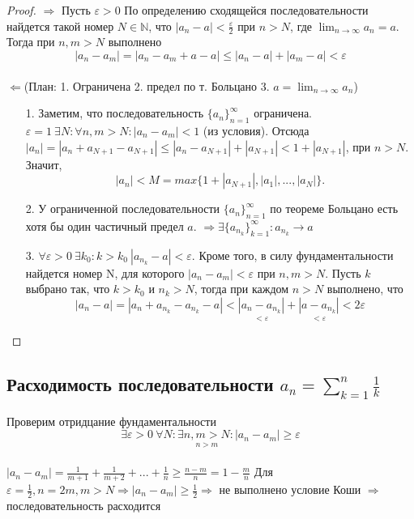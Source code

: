 \documentclass[12pt]{article}
\theoremstyle{definition}
\begin{document}
\begin{proof}
$\Longrightarrow$ Пусть $\varepsilon > 0$ По определению сходящейся последовательности найдется такой номер $N \in \mathds{N}$, что $|a_n - a| < \frac{\varepsilon}{2}$ при $n > N$, где $ \lim_{n\to\infty} a_n = a$. Тогда при $n, m > N$ выполнено $$|a_n - a_m| = |a_n - a_m + a - a| \leqslant |a_n - a| + |a_m - a| < \varepsilon$$ \\ $\Longleftarrow$(План: 1. Ограничена 2. предел по т. Больцано 3. $a = \lim_{n\to\infty}a_n$) \begin{itemize}
    \item[1.] Заметим, что последовательность $\{a_n\}_{n=1}^\infty$ ограничена. $\varepsilon = 1 \ \exists N: \forall n, m > N: |a_n - a_m| < 1$ (из условия). Отсюда $|a_n| = |a_n + a_{N+1} - a_{N+1}| \leqslant |a_n - a_{N+1}| + |a_{N+1}| < 1 + |a_{N+1}|$, при $n>N$. Значит, $$|a_n| < M = max\{1+|a_{N+1}|, |a_1|, ..., |a_N|\}.$$
    \item[2.]У ограниченной последовательности $\{a_n\}_{n=1}^\infty$ по теореме Больцано есть хотя бы один частичный предел $a$. $\Rightarrow \exists \{a_{n_{k}}\}_{k=1}^\infty: a_{n_{k}} \rightarrow a$
    \item[3.] $\forall \varepsilon > 0\ \exists k_0: k > k_0\ |a_{n_{k}} - a| < \varepsilon.$ Кроме того, в силу фундаментальности найдется номер N, для которого $|a_n - a_m| < \varepsilon$ при $n, m > N$. Пусть $k$ выбрано так, что $k > k_0$ и $n_k > N$, тогда при каждом $n > N$ выполнено, что $$|a_n - a| = |a_n + a_{n_{k}} - a_{n_{k}} - a| < \underset{<\varepsilon}{|a_n - a_{n_k}|} + \underset{<\varepsilon}{|a- a_{n_k}|} < 2\varepsilon$$
\end{itemize}
\end{proof}
\subsection{Расходимость последовательности $a_n = \sum^n_{k=1}\frac{1}{k}$} Проверим отридцание фундаментальности $$\exists \varepsilon > 0 \ \forall N: \exists \underset{n > m}{n,m > N}:|a_n - a_m| \geqslant \varepsilon$$ \\ $|a_n - a_m| = \frac{1}{m+1} + \frac{1}{m+2}+...+\frac{1}{n} 
\geqslant \frac{n-m}{n}= 1 - \frac{m}{n}$ Для $\varepsilon = \frac{1}{2}, n = 2m, m > N \Longrightarrow |a_n - a_m| \geqslant \frac{1}{2} \Longrightarrow$ не выполнено условие Коши $\Longrightarrow$ последовательность расходится
\end{document}
